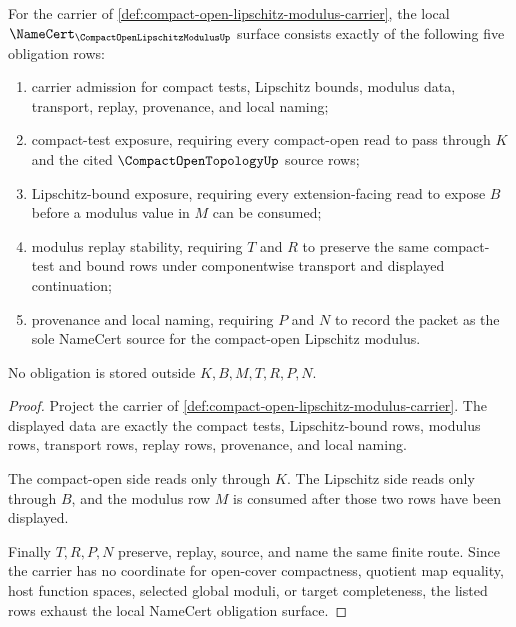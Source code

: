 \begin{theorem}
\label{thm:compact-open-lipschitz-modulus-obligations}
For the carrier of \autoref{def:compact-open-lipschitz-modulus-carrier}, the local $\NameCert_{\CompactOpenLipschitzModulusUp}$ surface consists exactly of the following five obligation rows:
\begin{enumerate}
\item carrier admission for compact tests, Lipschitz bounds, modulus data, transport, replay, provenance, and local naming;
\item compact-test exposure, requiring every compact-open read to pass through $K$ and the cited $\CompactOpenTopologyUp$ source rows;
\item Lipschitz-bound exposure, requiring every extension-facing read to expose $B$ before a modulus value in $M$ can be consumed;
\item modulus replay stability, requiring $T$ and $R$ to preserve the same compact-test and bound rows under componentwise transport and displayed continuation;
\item provenance and local naming, requiring $P$ and $N$ to record the packet as the sole NameCert source for the compact-open Lipschitz modulus.
\end{enumerate}
No obligation is stored outside $K,B,M,T,R,P,N$.
\end{theorem}
\begin{proof}
Project the carrier of \autoref{def:compact-open-lipschitz-modulus-carrier}. The displayed data are exactly the compact tests, Lipschitz-bound rows, modulus rows, transport rows, replay rows, provenance, and local naming.

The compact-open side reads only through $K$. The Lipschitz side reads only through $B$, and the modulus row $M$ is consumed after those two rows have been displayed.

Finally $T,R,P,N$ preserve, replay, source, and name the same finite route. Since the carrier has no coordinate for open-cover compactness, quotient map equality, host function spaces, selected global moduli, or target completeness, the listed rows exhaust the local NameCert obligation surface.
\end{proof}


